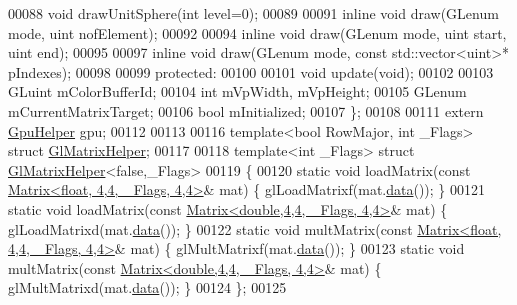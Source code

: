 \begin{DoxyCode}
00088     \textcolor{keywordtype}{void} drawUnitSphere(\textcolor{keywordtype}{int} level=0);
00089 
00091     \textcolor{keyword}{inline} \textcolor{keywordtype}{void} draw(GLenum mode, uint nofElement);
00092 
00094     \textcolor{keyword}{inline} \textcolor{keywordtype}{void} draw(GLenum mode, uint start, uint end);
00095 
00097     \textcolor{keyword}{inline} \textcolor{keywordtype}{void} draw(GLenum mode, \textcolor{keyword}{const} std::vector<uint>* pIndexes);
00098 
00099 \textcolor{keyword}{protected}:
00100 
00101     \textcolor{keywordtype}{void} update(\textcolor{keywordtype}{void});
00102 
00103     GLuint mColorBufferId;
00104     \textcolor{keywordtype}{int} mVpWidth, mVpHeight;
00105     GLenum mCurrentMatrixTarget;
00106     \textcolor{keywordtype}{bool} mInitialized;
00107 \};
00108 
00111 \textcolor{keyword}{extern} \hyperlink{class_gpu_helper}{GpuHelper} gpu;
00112 
00113 
00116 \textcolor{keyword}{template}<\textcolor{keywordtype}{bool} RowMajor, \textcolor{keywordtype}{int} \_Flags> \textcolor{keyword}{struct }\hyperlink{struct_gl_matrix_helper}{GlMatrixHelper};
00117 
00118 \textcolor{keyword}{template}<\textcolor{keywordtype}{int} \_Flags> \textcolor{keyword}{struct }\hyperlink{struct_gl_matrix_helper}{GlMatrixHelper}<false,\_Flags>
00119 \{
00120     \textcolor{keyword}{static} \textcolor{keywordtype}{void} loadMatrix(\textcolor{keyword}{const} \hyperlink{group___core___module_class_eigen_1_1_matrix}{Matrix<float, 4,4, \_Flags, 4,4>}&  mat) \{ 
      glLoadMatrixf(mat.\hyperlink{class_eigen_1_1_plain_object_base_ac25699535374b1854cf8494e44ad31b2}{data}()); \}
00121     \textcolor{keyword}{static} \textcolor{keywordtype}{void} loadMatrix(\textcolor{keyword}{const} \hyperlink{group___core___module_class_eigen_1_1_matrix}{Matrix<double,4,4, \_Flags, 4,4>}& mat) \{ 
      glLoadMatrixd(mat.\hyperlink{class_eigen_1_1_plain_object_base_ac25699535374b1854cf8494e44ad31b2}{data}()); \}
00122     \textcolor{keyword}{static} \textcolor{keywordtype}{void} multMatrix(\textcolor{keyword}{const} \hyperlink{group___core___module_class_eigen_1_1_matrix}{Matrix<float, 4,4, \_Flags, 4,4>}&  mat) \{ 
      glMultMatrixf(mat.\hyperlink{class_eigen_1_1_plain_object_base_ac25699535374b1854cf8494e44ad31b2}{data}()); \}
00123     \textcolor{keyword}{static} \textcolor{keywordtype}{void} multMatrix(\textcolor{keyword}{const} \hyperlink{group___core___module_class_eigen_1_1_matrix}{Matrix<double,4,4, \_Flags, 4,4>}& mat) \{ 
      glMultMatrixd(mat.\hyperlink{class_eigen_1_1_plain_object_base_ac25699535374b1854cf8494e44ad31b2}{data}()); \}
00124 \};
00125 

\end{DoxyCode}
